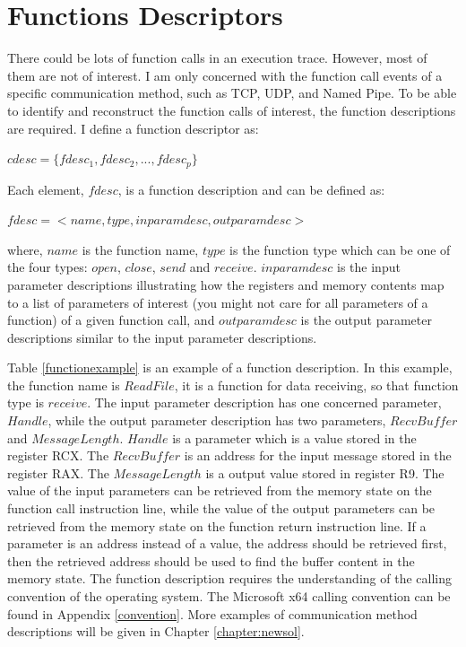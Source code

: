 \section{Functions Descriptors}\label{cdesc}
There could be lots of function calls in an execution trace. However, most of them are not of interest. I am only concerned with the function call events of a specific communication method, such as TCP, UDP, and Named Pipe. To be able to identify and reconstruct the function calls of interest, the function descriptions are required. I define a function descriptor as:

$cdesc = \lbrace fdesc_1, fdesc_2,...,fdesc_p \rbrace$

Each element, $fdesc$, is a function description and can be defined as:

$fdesc = < name, type, inparamdesc, outparamdesc >$

where, $name$ is the function name, $type$ is the function type which can be one of the four types: $open$, $close$, $send$ and $receive$. $inparamdesc$ is the input parameter descriptions illustrating how the registers and memory contents map to a list of parameters of interest (you might not care for all parameters of a function) of a given function call, and $outparamdesc$ is the output parameter descriptions similar to the input parameter descriptions. 

Table \ref{functionexample} is an example of a function description. In this example, the function name is $ReadFile$, it is a function for data receiving, so that function type is $receive$. The input parameter description has one concerned parameter, $Handle$, while the output parameter description has two parameters, ${RecvBuffer}$ and $MessageLength$. $Handle$ is a parameter which is a value stored in the register RCX. The $RecvBuffer$ is an address for the input message stored in the register RAX. The $MessageLength$ is a output value stored in register R9. The value of the input parameters can be retrieved from the memory state on the function call instruction line, while the value of the output parameters can be retrieved from the memory state on the function return instruction line. If a parameter is an address instead of a value, the address should be retrieved first, then the retrieved address should be used to find the buffer content in the memory state. The function description requires the understanding of the calling convention of the operating system. The Microsoft x64 calling convention can be found in Appendix \ref{convention}. More examples of communication method descriptions will be given in Chapter \ref{chapter:newsol}.

